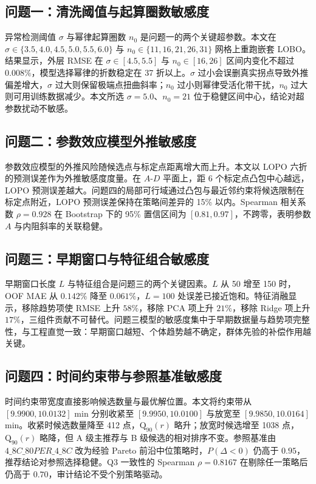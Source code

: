 \documentclass[12pt,a4paper]{article}
\begin{document}
\subsection{问题一：清洗阈值与起算圈数敏感度}

异常检测阈值 $\sigma$ 与幂律起算圈数 $n_0$ 是问题一的两个关键超参数。本文在 $\sigma\in\{3.5,4.0,4.5,5.0,5.5,6.0\}$ 与 $n_0\in\{11,16,21,26,31\}$ 网格上重跑嵌套 LOBO。结果显示，外层 RMSE 在 $\sigma\in[4.5,5.5]$ 与 $n_0\in[16,26]$ 区间内变化不超过 $0.008\%$，模型选择幂律的折数稳定在 37 折以上。$\sigma$ 过小会误删真实拐点导致外推偏差增大，$\sigma$ 过大则保留极端点扭曲斜率；$n_0$ 过小则幂律受活化带干扰，$n_0$ 过大则可用训练数据减少。本文所选 $\sigma=5.0$、$n_0=21$ 位于稳健区间中心，结论对超参数扰动不敏感。

\subsection{问题二：参数效应模型外推敏感度}

参数效应模型的外推风险随候选点与标定点距离增大而上升。本文以 LOPO 六折的预测误差作为外推敏感度度量。在 $A$-$D$ 平面上，距 6 个标定点凸包中心越远，LOPO 预测误差越大。问题四的局部可行域通过凸包与最近邻约束将候选限制在标定点附近，LOPO 预测误差保持在策略间差异的 15\% 以内。Spearman 相关系数 $\rho=0.928$ 在 Bootstrap 下的 95\% 置信区间为 $[0.81,0.97]$，不跨零，表明参数 $A$ 与内阻斜率的关联稳健。

\subsection{问题三：早期窗口与特征组合敏感度}

早期窗口长度 $L$ 与特征组合是问题三的两个关键因素。$L$ 从 50 增至 150 时，OOF MAE 从 $0.142\%$ 降至 $0.061\%$，$L=100$ 处误差已接近饱和。特征消融显示，移除趋势项使 RMSE 上升 $58\%$，移除 PCA 项上升 $21\%$，移除 Ridge 项上升 $17\%$，三组件贡献不可替代。问题三模型的敏感度集中于早期数据量与趋势项完整性，与工程直觉一致：早期窗口越短、个体趋势越不确定，群体先验的补偿作用越关键。

\subsection{问题四：时间约束带与参照基准敏感度}

时间约束带宽度直接影响候选数量与最优解位置。本文将约束带从 $[9.9900,10.0132]$ min 分别收紧至 $[9.9950,10.0100]$ 与放宽至 $[9.9850,10.0164]$ min。收紧时候选数量降至 412 点，$\mathrm{Q}_{90}(r)$ 略升；放宽时候选增至 1038 点，$\mathrm{Q}_{90}(r)$ 略降，但 A 级主推荐与 B 级候选的相对排序不变。参照基准由 $4\_8C\_80PER\_4\_8C$ 改为经验 Pareto 前沿中位策略时，$P(\Delta<0)$ 仍高于 $0.95$，推荐结论对参照选择稳健。Q3 一致性的 Spearman $\rho=0.8167$ 在剔除任一策略后仍高于 $0.70$，审计结论不受个别策略驱动。
\end{document}
